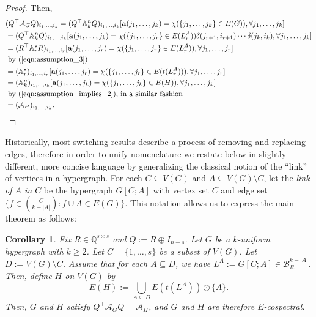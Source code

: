 \documentclass[12pt]{article}
\numberwithin{equation}{section}
\newtheorem{corollary}[theorem]{Corollary}
\theoremstyle{definition}
\newcommand{\ev}[1]{( #1 )}
\newcommand{\Q}{\mathbb{Q}}
\begin{document}
\begin{proof}
Then, 
\begin{align*}
& \ev{ Q^\top \mathcal{A}_G Q }_{ i_1,\ldots,i_k }  = (Q^\top \mathbb{A}^n_k Q)_{ i_1,\ldots,i_k } [ \mathbf{a}\ev{j_1,\ldots,j_k} = \chi\ev{ \{ j_1, \ldots, j_k \} \in E\ev{G} }, \forall j_1,\ldots,j_k ] \\
& = (Q^\top \mathbb{A}^n_k Q)_{ i_1,\ldots,i_k } [ \mathbf{a}\ev{j_1,\ldots, j_k} = \chi\ev{ \{ j_1, \ldots, j_r \} \in E\ev{L_r^A} } \delta\ev{j_{r+1},i_{r+1}} \cdots  \delta\ev{j_{k},i_{k}}, \forall j_1,\ldots,j_k ] \\ 
& = \ev{ R^\top \mathbb{A}^{s}_r R }_{i_1,\ldots,i_r} [ \mathbf{a}\ev{j_1,\ldots,j_r} = \chi\ev{ \{ j_1, \ldots, j_r \} \in E\ev{L_r^A} }, \forall j_1,\ldots,j_r ] \\
& \text{ by (\ref{eqn:assumption_3}) } \\
& =  \ev{ \mathbb{A}^{s}_r }_{i_1,\ldots,i_r} [ \mathbf{a}\ev{j_1,\ldots,j_r} = \chi\ev{ \{ j_1, \ldots, j_r \} \in E\ev{t\ev{L_r^A}} }, \forall j_1,\ldots,j_r ]\\ 
& =  \ev{ \mathbb{A}^{n}_k }_{i_1,\ldots,i_k} [ \mathbf{a}\ev{j_1,\ldots,j_k} = \chi\ev{ \{ j_1, \ldots, j_k \} \in E\ev{H} }, \forall j_1,\ldots,j_k ]\\
& \text{ by (\ref{eqn:assumption_implies_2}), in a similar fashion} \\
& = \ev{ \mathcal{A}_H }_{ i_1,\ldots,i_k }.
\qedhere\end{align*}
\end{proof}

Historically, most switching results describe a process of removing and replacing edges, therefore in order to unify nomenclature we restate  below in slightly different, more concise language by generalizing the classical notion of the ``link'' of vertices in a hypergraph. For each $C\subseteq V\ev{G}$ and $A\subseteq V\ev{G}\setminus C$, let the \textit{link of $A$ in $C$} be the hypergraph $G[C;A]$ with vertex set $C$ and edge set $\{ f\in \binom{C}{k-|A|} : f\cup A \in E\ev{G} \} $. This notation allows us to express the main theorem as follows: 

\begin{corollary}
\label{cor:main_theorem_2}
Fix $R\in \Q^{s\times s}$ and $Q := R\oplus I_{n-s}$. Let $G$ be a $k$-uniform hypergraph with $k\geq 2$. Let $C=\{ 1,\ldots, s \}$ be a subset of $V\ev{G}$. Let $D := V\ev{G}\setminus C $. Assume that for each $A \subseteq D$, we have $L^{A} := G[C;A] \in \mathcal{B}^{k-|A|}_{R}$. Then, define $H$ on $V\ev{G}$ by 
$$
E\ev{H} := \bigcup_{A \subseteq D}  E\ev{t\ev{L^{A}}} \odot \{A\}.
$$
Then, $G$ and $H$ satisfy $Q^\top \mathcal{A}_{G} Q = \mathcal{A}_{H}$, and $G$ and $H$ are therefore $E$-cospectral.
\end{corollary} 
\end{document}
